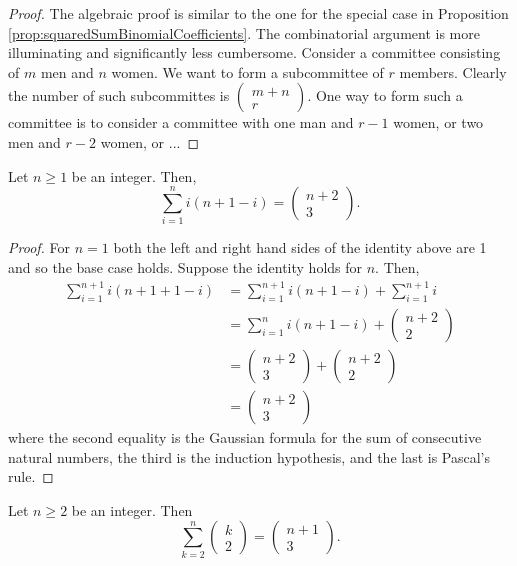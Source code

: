 \begin{proof}
The algebraic proof is similar to the one for the special case in
Proposition \ref{prop:squaredSumBinomialCoefficients}. The combinatorial
argument is more illuminating and significantly less cumbersome. Consider
a committee consisting of $m$ men and $n$ women. We want to form
a subcommittee of $r$ members. Clearly the number of such subcommittes
is $\left(\begin{array}{c}
m+n\\
r
\end{array}\right)$. One way to form such a committee is to consider a committee with
one man and $r-1$ women, or two men and $r-2$ women, or ...
\end{proof}
\begin{prop}
\label{prop:mdmActivity103}Let $n\geq1$ be an integer. Then,
\[
\sum_{i=1}^{n}i\left(n+1-i\right)=\left(\begin{array}{c}
n+2\\
3
\end{array}\right).
\]
\end{prop}

\begin{proof}
For $n=1$ both the left and right hand sides of the identity above
are 1 and so the base case holds. Suppose the identity holds for $n$.
Then,
\begin{align*}
\sum_{i=1}^{n+1}i\left(n+1+1-i\right) & =\sum_{i=1}^{n+1}i\left(n+1-i\right)+\sum_{i=1}^{n+1}i\\
 & =\sum_{i=1}^{n}i\left(n+1-i\right)+\left(\begin{array}{c}
n+2\\
2
\end{array}\right)\\
 & =\left(\begin{array}{c}
n+2\\
3
\end{array}\right)+\left(\begin{array}{c}
n+2\\
2
\end{array}\right)\\
 & =\left(\begin{array}{c}
n+2\\
3
\end{array}\right)
\end{align*}
where the second equality is the Gaussian formula for the sum of consecutive
natural numbers, the third is the induction hypothesis, and the last
is Pascal's rule.
\end{proof}
\begin{prop}
\label{prop:sumOfBinomialCoefficients2}Let $n\geq2$ be an integer.
Then
\[
\sum_{k=2}^{n}\left(\begin{array}{c}
k\\
2
\end{array}\right)=\left(\begin{array}{c}
n+1\\
3
\end{array}\right).
\]
\end{prop}

